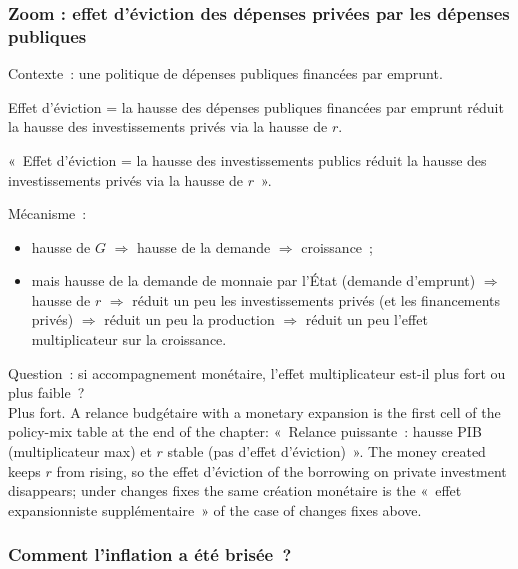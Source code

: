 \subsubsection{Zoom : effet d'éviction des dépenses privées par les dépenses publiques}

Contexte~: une politique de dépenses publiques financées par emprunt.

\begin{definition}
  Effet d'éviction = la hausse des dépenses publiques financées par emprunt réduit la
  hausse des investissements privés via la hausse de $r$.
\end{definition}

\begin{remark}
  «~Effet d'éviction = la hausse des investissements publics réduit la hausse des
  investissements privés via la hausse de $r$~».
\end{remark}

Mécanisme~:
\begin{itemize}
  \item hausse de $G$ $\Rightarrow$ hausse de la demande $\Rightarrow$ croissance~;
  \item mais hausse de la demande de monnaie par l'État (demande d'emprunt)
    $\Rightarrow$ hausse de $r$ $\Rightarrow$ réduit un peu les investissements privés
    (et les financements privés) $\Rightarrow$ réduit un peu la production
    $\Rightarrow$ réduit un peu l'effet multiplicateur sur la croissance.
\end{itemize}

\begin{example}
  Question~: si accompagnement monétaire, l'effet multiplicateur est-il plus fort ou
  plus faible~?\\
  Plus fort. A relance budgétaire with a monetary expansion is the first cell of the
  policy-mix table at the end of the chapter: «~Relance puissante~: hausse PIB
  (multiplicateur max) et $r$ stable (pas d'effet d'éviction)~». The money created
  keeps $r$ from rising, so the effet d'éviction of the borrowing on private
  investment disappears; under changes fixes the same création monétaire is the
  «~effet expansionniste supplémentaire~» of the case of changes fixes above.
\end{example}

\subsubsection{Comment l'inflation a été brisée~?}

